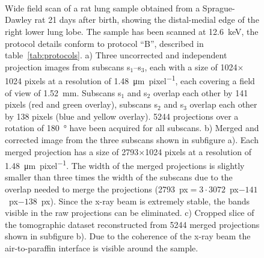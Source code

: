 \ifiucr
	\begin{figure}%
		\caption{Wide field scan of a rat lung sample obtained from a Sprague-Dawley rat 21 days after birth, showing the distal-medial edge of the right lower lung lobe. The sample has been scanned at \SI{12.6}{\kilo\electronvolt}, the protocol details conform to protocol ``B'', described in table~\ref{tab:protocols}. %
		a) Three uncorrected and independent projection images from subscans s$_1$--s$_3$, each with a size of 1024\(\times\)1024 pixels at a resolution of \SI{1.48}{\micro\meter\per pixel}, each covering a field of view of \SI{1.52}{\milli\meter}. Subscans s$_1$ and s$_2$ overlap each other by 141 pixels (red and green overlay), subscans s$_2$ and s$_3$ overlap each other by 138 pixels (blue and yellow overlay). 5244 projections over a rotation of \SI{180}{\degree} have been acquired for all subscans. %
		b) Merged and corrected image from the three subscans shown in subfigure a). Each merged projection has a size of 2793\(\times\)1024 pixels at a resolution of \SI{1.48}{\micro\meter\per pixel}. The width of the merged projections is slightly smaller than three times the width of the subscans due to the overlap needed to merge the projections (2793~px$=3\cdot3072$~px$-141$~px$-138$~px). Since the x-ray beam is extremely stable, the bands visible in the raw projections can be eliminated. %
		c) Cropped slice of the tomographic dataset reconstructed from 5244 merged projections shown in subfigure b). Due to the coherence of the x-ray beam the air-to-paraffin interface is visible around the sample.%
		}%
		\label{fig:wide field scan results}%
		\\%
		\\%
		\\%
	\end{figure}%
\else

